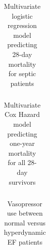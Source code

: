 \documentclass[final,10pt]{elsarticle}
\begin{document}
\begin{table}[t]
\begin{tabular}{l c c c}
\toprule

\bottomrule
\end{tabular}
\caption{Multivariate logistic regression model predicting 28-day mortality for septic patients}
\label{tbl:acute-charac}
\end{table}

\begin{table}[h]
\begin{tabular}{l c c}
\toprule

\bottomrule
\end{tabular}
\caption{Multivariate Cox Hazard model predicting one-year mortality for all 28-day survivors}
\label{tbl:all-comorb}
\end{table}

\begin{table}
\begin{tabular}{l c c c}
\toprule

\bottomrule
\end{tabular}
\caption{Vasopressor use between normal versus hyperdynamic EF patients}
\label{tbl1:hypers}
\end{table}














\end{document}
